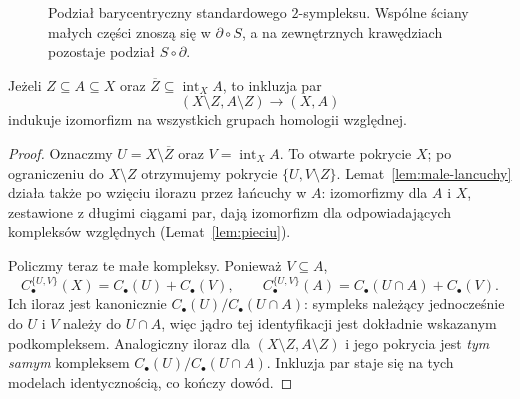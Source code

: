 \begin{figure}[!htbp]
\centering
{}
\caption{Podział barycentryczny standardowego $2$-sympleksu.
Wspólne ściany małych części znoszą się w $\partial\circ S$,
a na zewnętrznych krawędziach pozostaje podział $S\circ\partial$.}
\label{fig:podzial-barycentryczny-8}
\end{figure}

\begin{twierdzenie}[Wycinanie]
\label{thm:wycinanie}
Jeżeli $Z\subseteq A\subseteq X$ oraz
$\overline Z\subseteq\operatorname{int}_X A$,
to inkluzja par
\[
 (X\setminus Z,A\setminus Z)\longrightarrow(X,A)
\]
indukuje izomorfizm na wszystkich
grupach homologii względnej.
\end{twierdzenie}
\begin{proof}
Oznaczmy $U=X\setminus\overline Z$
oraz $V=\operatorname{int}_X A$.
To otwarte pokrycie $X$;
po ograniczeniu do $X\setminus Z$
otrzymujemy pokrycie
$\{U,V\setminus Z\}$.
Lemat~\ref{lem:male-lancuchy} działa
także po wzięciu ilorazu przez
łańcuchy w $A$: izomorfizmy
dla $A$ i $X$, zestawione
z długimi ciągami par, dają
izomorfizm dla odpowiadających
kompleksów względnych
(Lemat~\ref{lem:pieciu}).

Policzmy teraz te małe kompleksy.
Ponieważ $V\subseteq A$,
\[
 C_\bullet^{\{U,V\}}(X)
   =C_\bullet(U)+C_\bullet(V),\qquad
 C_\bullet^{\{U,V\}}(A)
   =C_\bullet(U\cap A)+C_\bullet(V).
\]
Ich iloraz jest kanonicznie
$C_\bullet(U)/C_\bullet(U\cap A)$:
sympleks należący jednocześnie do
$U$ i $V$ należy do $U\cap A$,
więc jądro tej identyfikacji jest
dokładnie wskazanym podkompleksem.
Analogiczny iloraz dla
$(X\setminus Z,A\setminus Z)$
i jego pokrycia jest \emph{tym samym}
kompleksem
$C_\bullet(U)/C_\bullet(U\cap A)$.
Inkluzja par staje się na tych
modelach identycznością, co
kończy dowód.
\end{proof}

